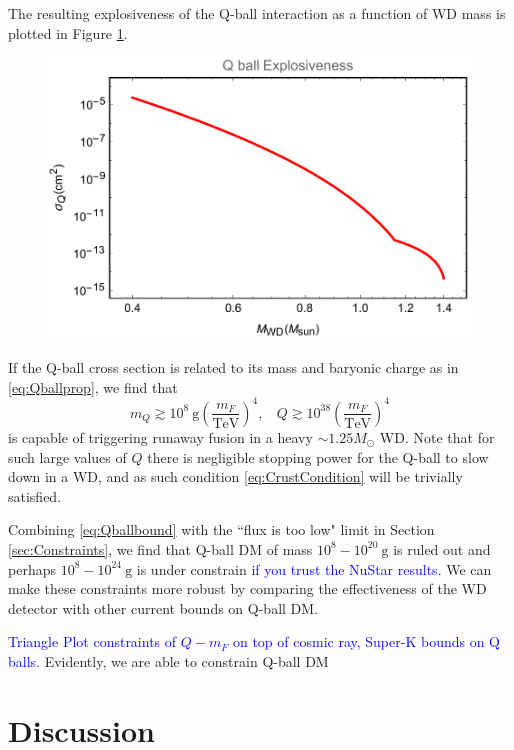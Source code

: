 \documentclass[twocolumn,showpacs,preprintnumbers,amsmath,amssymb,prd]{revtex4}
\def\r{\right)}
\def\l{\left(}
\begin{document}
The resulting explosiveness of the Q-ball interaction as a function of WD mass is plotted in Figure \ref{fig:boomQball}. 
\begin{figure}
\label{fig:boomQball}
\includegraphics[scale=.45]{boomQball.pdf}
\end{figure}
If the Q-ball cross section is related to its mass and baryonic charge as in \eqref{eq:Qballprop}, we find that
\begin{equation}
\label{eq:Qballbound}
m_Q \gtrsim 10^8 ~\text{g} \l\frac{m_F}{\text{TeV}}\r^4, ~~~~ Q \gtrsim 10^{38} \l\frac{m_F}{\text{TeV}}\r^4
\end{equation}
is capable of triggering runaway fusion in a heavy $\sim 1.25 M_{\odot}$ WD. Note that for such large values of $Q$ there is negligible stopping power for the Q-ball to slow down in a WD, and as such condition \eqref{eq:CrustCondition} will be trivially satisfied. 

Combining \eqref{eq:Qballbound} with the ``flux is too low" limit in Section \ref{sec:Constraints}, we find that Q-ball DM of mass $10^{8} - 10^{20} ~\text{g}$ is ruled out and perhaps $10^{8} - 10^{24} ~\text{g}$ is under constrain \textcolor{blue}{if you trust the NuStar results}. We can make these constraints more robust by comparing the effectiveness of the WD detector with other current bounds on Q-ball DM. 

\textcolor{blue}{Triangle Plot constraints of $Q - m_F$ on top of cosmic ray, Super-K bounds on Q balls}.
Evidently, we are able to constrain Q-ball DM 

\section{Discussion}
\label{sec:discussion}
\end{document}
